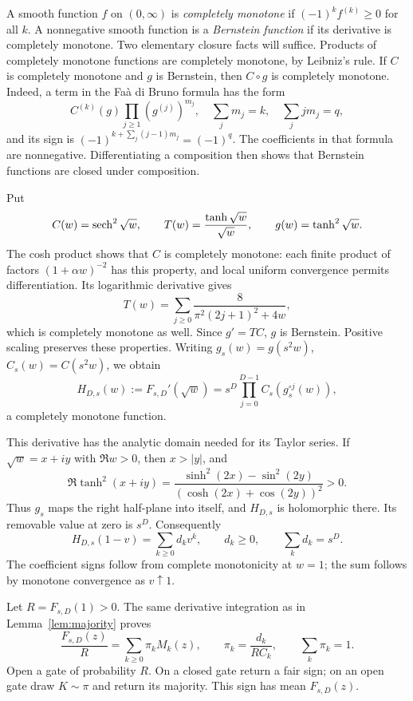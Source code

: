 A smooth function \(f\) on \((0,\infty)\) is
\emph{completely monotone} if \((-1)^kf^{(k)}\ge0\) for all \(k\).
A nonnegative smooth function is a \emph{Bernstein function} if
its derivative is completely monotone.
Two elementary closure facts will suffice. Products of completely
monotone functions are completely monotone, by Leibniz's rule.
If \(C\) is completely monotone and \(g\) is Bernstein, then
\(C\circ g\) is completely monotone. Indeed, a term in the
Faà di Bruno formula has the form
\[
C^{(k)}(g)\prod_{j\ge1}(g^{(j)})^{m_j},
\quad \sum_jm_j=k,\quad\sum_jjm_j=q,
\]
and its sign is \((-1)^{k+\sum_j(j-1)m_j}=(-1)^q\).
The coefficients in that formula are nonnegative.
Differentiating a composition then shows that Bernstein functions
are closed under composition.

Put
\[
C(w)=\operatorname{sech}^2\sqrt w,\qquad
T(w)=\frac{\tanh\sqrt w}{\sqrt w},\qquad
g(w)=\tanh^2\sqrt w.
\]
The cosh product shows that \(C\) is completely monotone:
each finite product of factors \((1+\alpha w)^{-2}\) has this
property, and local uniform convergence permits differentiation.
Its logarithmic derivative gives
\[
T(w)=\sum_{j\ge0}\frac8{\pi^2(2j+1)^2+4w},
\]
which is completely monotone as well.
Since \(g'=TC\), \(g\) is Bernstein.
Positive scaling preserves these properties.
Writing \(g_s(w)=g(s^2w)\), \(C_s(w)=C(s^2w)\), we obtain
\begin{equation}\label{eq:chainH}
H_{D,s}(w):=F_{s,D}'(\sqrt w)
=s^D\prod_{j=0}^{D-1}C_s(g_s^{\circ j}(w)),
\end{equation}
a completely monotone function.

This derivative has the analytic domain needed for its Taylor
series. If \(\sqrt w=x+iy\) with \(\Re w>0\), then \(x>|y|\), and
\[
\Re\tanh^2(x+iy)
=\frac{\sinh^2(2x)-\sin^2(2y)}
       {(\cosh(2x)+\cos(2y))^2}>0.
\]
Thus \(g_s\) maps the right half-plane into itself, and
\(H_{D,s}\) is holomorphic there.
Its removable value at zero is \(s^D\).
Consequently
\[
H_{D,s}(1-v)=\sum_{k\ge0}d_kv^k,\qquad d_k\ge0,\qquad
\sum_kd_k=s^D.
\]
The coefficient signs follow from complete monotonicity at \(w=1\);
the sum follows by monotone convergence as \(v\uparrow1\).

Let \(R=F_{s,D}(1)>0\).
The same derivative integration as in Lemma~\ref{lem:majority} proves
\begin{equation}\label{eq:chainmixture}
\frac{F_{s,D}(z)}R=\sum_{k\ge0}\pi_kM_k(z),
\qquad \pi_k=\frac{d_k}{R C_k},\qquad \sum_k\pi_k=1.
\end{equation}
Open a gate of probability \(R\). On a closed gate return a fair
sign; on an open gate draw \(K\sim\pi\) and return its majority.
This sign has mean \(F_{s,D}(z)\).

